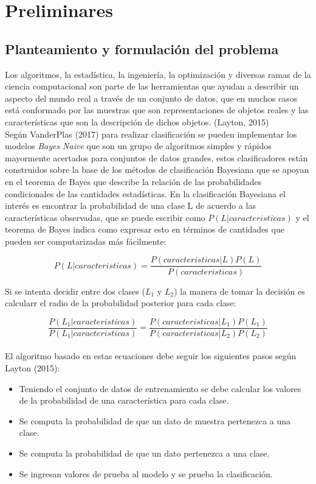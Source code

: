 \chapter{Preliminares}

\section{Planteamiento y formulaci\'on del problema}

Los algoritmos, la estadística, la ingeniería, la optimización y diversas ramas de la ciencia computacional son parte de las herramientas que ayudan a describir un aspecto del mundo real a través de un conjunto de datos,  que en muchos casos está conformado por las muestras que son representaciones de objetos reales y las características que son la descripción de dichos objetos. (Layton, 2015)\\

Según VanderPlas (2017) para realizar clasificación se pueden implementar los modelos \textit{Bayes Naive} que son un grupo de algoritmos simples y rápidos mayormente acertados para conjuntos de datos grandes, estos clasificadores están construidos sobre la base de los métodos de clasificación Bayesiana que se apoyan en el teorema de Bayes que describe la relación de las probabilidades condicionales de las cantidades estadísticas. En la clasificación Bayesiana el interés es encontrar la probabilidad de una clase L de acuerdo a las características observadas, que se puede escribir como $P\left(L|caracteristicas\right)$ y el teorema de Bayes indica como expresar esto en términos de cantidades que pueden ser computarizadas más fácilmente:

\[P\left(L|caracteristicas\right)=\frac{P\left(caracteristicas|L\right)P\left(L\right)}{P\left(caracteristicas\right)}\]

Si se intenta decidir entre dos clases ($L_{1}$ y $L_{2}$) la manera de tomar la decisión es calcularr el radio de la probabilidad posterior para cada clase:

\[\frac{P\left(L_{1}|caracteristicas\right)}{P\left(L_{1}|caracteristicas\right)}=\frac{P\left(caracteristicas|L_{1}\right)P\left(L_{1}\right)}{P\left(caracteristicas|L_{2}\right)P\left(L_{2}\right)}\]\\

El algoritmo basado en estas ecuaciones debe seguir los siguientes pasos según Layton (2015):

\begin{itemize}
	\item Teniendo el conjunto de datos de entrenamiento se debe calcular los valores de la probabilidad de una característica para cada clase.
	\item Se computa la probabilidad de que un dato de muestra pertenezca a una clase.
	\item Se computa la probabilidad de que un dato pertenezca a una clase.
	\item Se ingresan valores de prueba al modelo y se prueba la clasificación.
\end{itemize}

